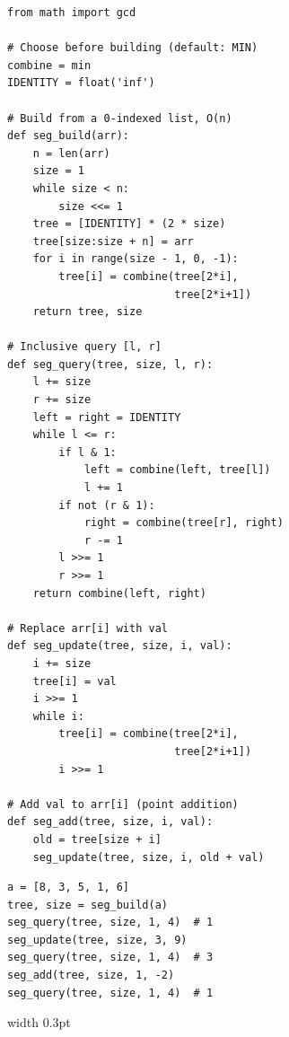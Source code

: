 \documentclass[9pt,a4paper]{extarticle}
\begin{document}
\begin{minipage}[t]{\textwidth}
\begin{minipage}[t]{0.493\linewidth}
\vspace{0pt}


\begin{lstlisting}
from math import gcd

# Choose before building (default: MIN)
combine = min
IDENTITY = float('inf')

# Build from a 0-indexed list, O(n)
def seg_build(arr):
    n = len(arr)
    size = 1
    while size < n:
        size <<= 1
    tree = [IDENTITY] * (2 * size)
    tree[size:size + n] = arr
    for i in range(size - 1, 0, -1):
        tree[i] = combine(tree[2*i],
                          tree[2*i+1])
    return tree, size

# Inclusive query [l, r]
def seg_query(tree, size, l, r):
    l += size
    r += size
    left = right = IDENTITY
    while l <= r:
        if l & 1:
            left = combine(left, tree[l])
            l += 1
        if not (r & 1):
            right = combine(tree[r], right)
            r -= 1
        l >>= 1
        r >>= 1
    return combine(left, right)

# Replace arr[i] with val
def seg_update(tree, size, i, val):
    i += size
    tree[i] = val
    i >>= 1
    while i:
        tree[i] = combine(tree[2*i],
                          tree[2*i+1])
        i >>= 1

# Add val to arr[i] (point addition)
def seg_add(tree, size, i, val):
    old = tree[size + i]
    seg_update(tree, size, i, old + val)
\end{lstlisting}



\begin{lstlisting}
a = [8, 3, 5, 1, 6]
tree, size = seg_build(a)
seg_query(tree, size, 1, 4)  # 1
seg_update(tree, size, 3, 9)
seg_query(tree, size, 1, 4)  # 3
seg_add(tree, size, 1, -2)
seg_query(tree, size, 1, 4)  # 1
\end{lstlisting}

\end{minipage}%
\hfill\vrule width 0.3pt\hfill%
\begin{minipage}[t]{0.475\linewidth}
\vspace{0pt}
\raggedright



\end{minipage}
\end{minipage}
\end{document}
